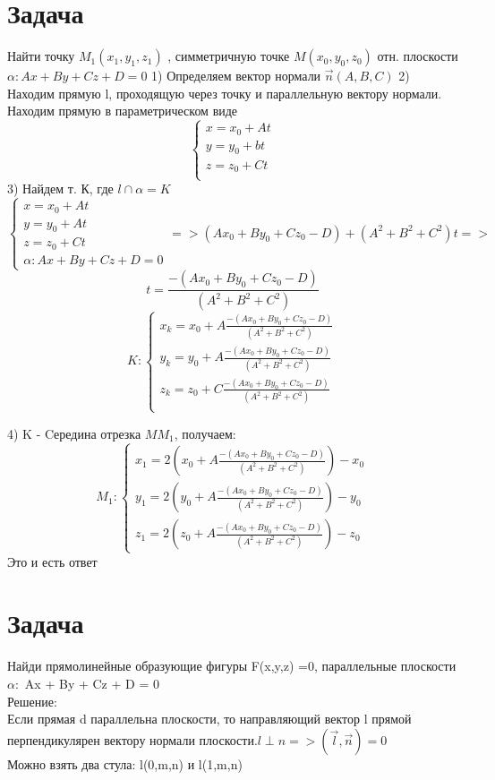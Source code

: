 \documentclass[a4paper,14pt]{extreport} %
\begin{document}
\section*{Задача}
Найти точку $ M_1(x_1,y_1,z_1)$ , симметричную точке $M(x_0,y_0,z_0)$ отн. плоскости $ \alpha: Ax + By + Cz+ D = 0$
1) Определяем вектор нормали $ \vec{n}(A,B,C)$
2) Находим прямую l, проходящую через точку и параллельную вектору нормали. Находим прямую в параметрическом виде
$$
\begin{cases}
  x = x_0 + At \\
  y = y_0 + bt \\
  z = z_0 + Ct \\
\end{cases}
$$
3) Найдем т. К, где $ l \cap \alpha  = K $ 
\[
  \begin{cases}
    
  x = x_0 + At \\
  y = y_0 + At \\
  z = z_0 + Ct \\
\alpha: Ax + By + Cz+ D = 0
  \end{cases} => (Ax_0 + By_0 + Cz_0 - D) +(A^2 + B^2 + C^2) t  =>  
\]
  \[    
  t = \frac{-(Ax_0 + By_0 + Cz_0 - D)}{(A^2 + B^2 + C^2)}
  \]
  \[
    K: \begin{cases}
  x_k = x_0 + A\frac{-(Ax_0 + By_0 + Cz_0 - D)}{(A^2 + B^2 + C^2)} \\
  y_k = y_0 + A\frac{-(Ax_0 + By_0 + Cz_0 - D)}{(A^2 + B^2 + C^2)} \\
  z_k = z_0 + C\frac{-(Ax_0 + By_0 + Cz_0 - D)}{(A^2 + B^2 + C^2)} \\
    \end{cases}
  \]

4) K - Cередина отрезка $ MM_1 $, получаем:
\[
  M_1: \begin{cases}
    x_1 = 2(x_0 + A\frac{-(Ax_0 + By_0 + Cz_0 - D)}{(A^2 + B^2 + C^2)} ) - x_0\\
    y_1 = 2(y_0 + A\frac{-(Ax_0 + By_0 + Cz_0 - D)}{(A^2 + B^2 + C^2)} ) - y_0\\
    z_1 = 2(z_0 + A\frac{-(Ax_0 + By_0 + Cz_0 - D)}{(A^2 + B^2 + C^2)} ) - z_0
  \end{cases}
\]
Это и есть ответ

\section*{Задача}
Найди прямолинейные образующие фигуры F(x,y,z) =0, параллельные плоскости $\alpha:$ Ax + By + Cz + D = 0 \\ 
Решение: \\ 
Если прямая d параллельна плоскости, 
то направляющий вектор l прямой перпендикулярен вектору нормали плоскости.$ l \perp n =>(\vec{l}, \vec{n}) = 0 $ \\
Можно взять два стула: l(0,m,n) и l(1,m,n)
\end{document}
